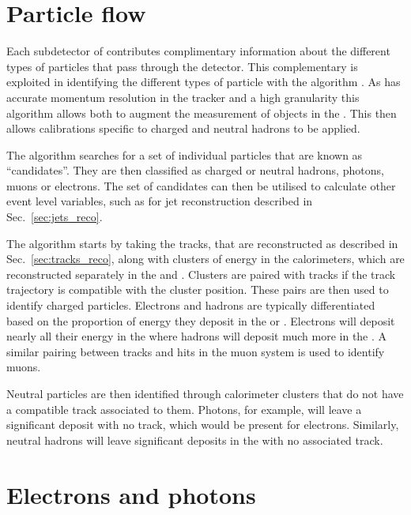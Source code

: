 \section{Particle flow}
\label{sec:pflow_reco}

Each subdetector of \CMS contributes complimentary information about
the different types of particles that pass through the detector. This
complementary is exploited in identifying the different types of
particle with the \PF algorithm
\cite{CMS-PAS-PFT-09-001,CMS-PAS-PFT-10-001,CMS-PAS-PFT-10-002}. As
\CMS has accurate momentum resolution in the tracker and a high
granularity \ECAL this algorithm allows both to augment the
measurement of objects in the \HCAL. This then allows calibrations
specific to charged and neutral hadrons to be applied. 

The \PF algorithm searches for a set of individual particles that are
known as ``\PF candidates''. They are then classified as charged or
neutral hadrons, photons, muons or electrons. The set of \PF
candidates can then be utilised to calculate other event level
variables, such as for jet reconstruction described in
Sec.~\ref{sec:jets_reco}.

The algorithm starts by taking the tracks, that are reconstructed as
described in Sec.~\ref{sec:tracks_reco}, along with clusters of energy
in the calorimeters, which are reconstructed separately in the \ECAL and
\HCAL. Clusters are paired with tracks if the track trajectory is
compatible with the cluster position. These pairs are then used to
identify charged particles. Electrons and hadrons are typically
differentiated based on the proportion of energy they deposit in the
\ECAL or \HCAL. Electrons will deposit nearly all their energy in the
\ECAL where hadrons will deposit much more in the \HCAL. A similar
pairing between tracks and hits in the muon system is used to identify
muons. 

Neutral particles are then identified through calorimeter clusters
that do not have a compatible track associated to them. Photons, for
example, will leave a significant \ECAL deposit with no track, which
would be present for electrons. Similarly, neutral hadrons will leave
significant deposits in the \HCAL with no associated track.

\section{Electrons and photons}
\label{sec:electrons_reco}

